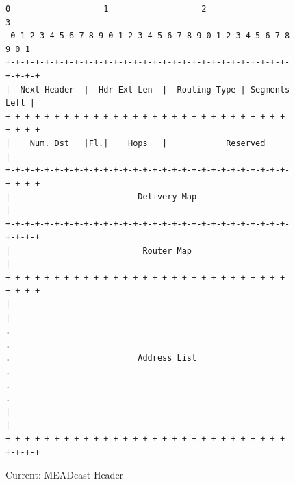 \begin{figure}[h!]
\centering
\begin{lstlisting}[xleftmargin=.07\textwidth]
 0                   1                   2                   3
 0 1 2 3 4 5 6 7 8 9 0 1 2 3 4 5 6 7 8 9 0 1 2 3 4 5 6 7 8 9 0 1
+-+-+-+-+-+-+-+-+-+-+-+-+-+-+-+-+-+-+-+-+-+-+-+-+-+-+-+-+-+-+-+-+
|  Next Header  |  Hdr Ext Len  |  Routing Type | Segments Left |
+-+-+-+-+-+-+-+-+-+-+-+-+-+-+-+-+-+-+-+-+-+-+-+-+-+-+-+-+-+-+-+-+
|    Num. Dst   |Fl.|    Hops   |            Reserved           |
+-+-+-+-+-+-+-+-+-+-+-+-+-+-+-+-+-+-+-+-+-+-+-+-+-+-+-+-+-+-+-+-+
|                          Delivery Map                         |
+-+-+-+-+-+-+-+-+-+-+-+-+-+-+-+-+-+-+-+-+-+-+-+-+-+-+-+-+-+-+-+-+
|                           Router Map                          |
+-+-+-+-+-+-+-+-+-+-+-+-+-+-+-+-+-+-+-+-+-+-+-+-+-+-+-+-+-+-+-+-+
|                                                               |
.                                                               .
.                          Address List                         .
.                                                               .
|                                                               |
+-+-+-+-+-+-+-+-+-+-+-+-+-+-+-+-+-+-+-+-+-+-+-+-+-+-+-+-+-+-+-+-+

\end{lstlisting}
\caption{Current: MEADcast Header}
\end{figure}

